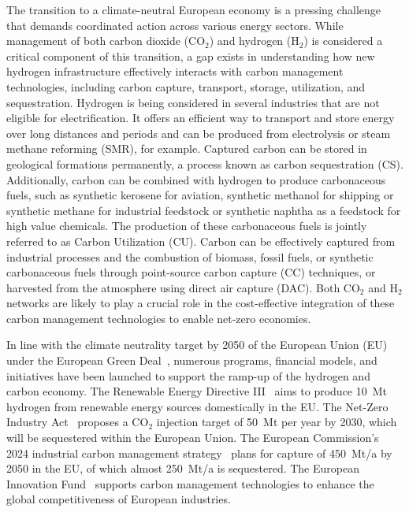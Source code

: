 \documentclass[twocolumn]{article}
\newcommand{\carbon}{CO$_2$}
\newcommand{\hydrogen}{H$_2$}
\begin{document}
The transition to a climate-neutral European economy is a pressing challenge that demands coordinated action across various energy sectors. While management of both carbon dioxide (\carbon{}) and hydrogen (\hydrogen{}) is considered a critical component of this transition, a gap exists in understanding how new hydrogen infrastructure effectively interacts with carbon management technologies, including carbon capture, transport, storage, utilization, and sequestration. Hydrogen is being considered in several industries that are not eligible for electrification. It offers an efficient way to transport and store energy over long distances and periods and can be produced from electrolysis or steam methane reforming (SMR), for example. Captured carbon can be stored in geological formations permanently, a process known as carbon sequestration (CS). Additionally, carbon can be combined with hydrogen to produce carbonaceous fuels, such as synthetic kerosene for aviation, synthetic methanol for shipping or synthetic methane for industrial feedstock or synthetic naphtha as a feedstock for high value chemicals. The production of these carbonaceous fuels is jointly referred to as Carbon Utilization (CU). Carbon can be effectively captured from industrial processes and the combustion of biomass, fossil fuels, or synthetic carbonaceous fuels through point-source carbon capture (CC) techniques, or harvested from the atmosphere using direct air capture (DAC). Both \carbon{} and \hydrogen{} networks are likely to play a crucial role in the cost-effective integration of these carbon management technologies to enable net-zero economies.

In line with the climate neutrality target by 2050 of the European Union (EU) under the European Green Deal~\cite{europeangreendeal}, numerous programs, financial models, and initiatives have been launched to support the ramp-up of the hydrogen and carbon economy. The Renewable Energy Directive III~\cite{DirectiveEU20232023} aims to produce 10~Mt hydrogen from renewable energy sources domestically in the EU. The Net-Zero Industry Act~\cite{eu2023netzero} proposes a \carbon{} injection target of 50~Mt per year by 2030, which will be sequestered within the European Union. The European Commission's 2024 industrial carbon management strategy~\cite{comcms} plans for capture of 450~Mt/a by 2050 in the EU, of which almost 250~Mt/a is sequestered.  The European Innovation Fund~\cite{europeaninnovationfund} supports carbon management technologies to enhance the global competitiveness of European industries.
\end{document}
